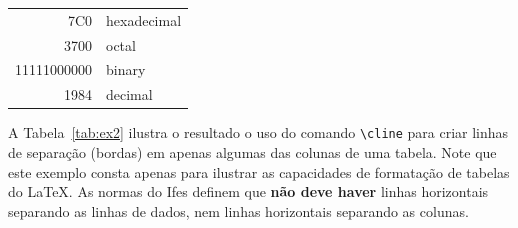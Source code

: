 \documentclass[times,english,brazil,oneside,section=TITLE]{ifes8}
\begin{document}
\begin{quadro}[htb]
  \begin{center}
    \caption{Exemplo de uso de \texttt{cline} para formatação de tabelas.}
    \label{tab:ex2}
    \begin{tabular}{|r|l|}
      \hline
      7C0         & hexadecimal \\
      3700        & octal       \\ \cline{2-2}
      11111000000 & binary      \\
      \hline
      \hline
      1984        & decimal     \\
      \hline
    \end{tabular}
  \end{center}
\end{quadro}

A Tabela~\ref{tab:ex2} ilustra o resultado o uso do comando
\verb!\cline! para criar linhas de separação (bordas) em apenas
algumas das colunas de uma tabela. Note que este exemplo consta apenas
para ilustrar as capacidades de formatação de tabelas do \LaTeX. As
normas do Ifes definem que \textbf{não deve haver} linhas horizontais
separando as linhas de dados, nem linhas horizontais separando as
colunas.
\end{document}
